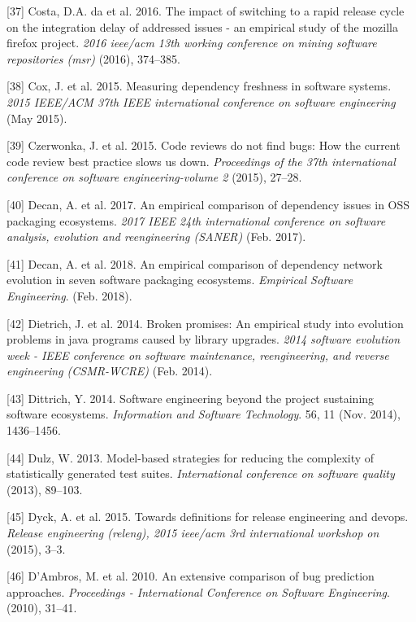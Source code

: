 \documentclass[]{book}
\begin{document}
\hypertarget{ref-da2016a}{}
{[}37{]} Costa, D.A. da et al. 2016. The impact of switching to a rapid
release cycle on the integration delay of addressed issues - an
empirical study of the mozilla firefox project. \emph{2016 ieee/acm 13th
working conference on mining software repositories (msr)} (2016),
374--385.

\hypertarget{ref-Cox2015}{}
{[}38{]} Cox, J. et al. 2015. Measuring dependency freshness in software
systems. \emph{2015 IEEE/ACM 37th IEEE international conference on
software engineering} (May 2015).

\hypertarget{ref-czerwonka2015code}{}
{[}39{]} Czerwonka, J. et al. 2015. Code reviews do not find bugs: How
the current code review best practice slows us down. \emph{Proceedings
of the 37th international conference on software engineering-volume 2}
(2015), 27--28.

\hypertarget{ref-Decan2017}{}
{[}40{]} Decan, A. et al. 2017. An empirical comparison of dependency
issues in OSS packaging ecosystems. \emph{2017 IEEE 24th international
conference on software analysis, evolution and reengineering (SANER)}
(Feb. 2017).

\hypertarget{ref-Decan2018}{}
{[}41{]} Decan, A. et al. 2018. An empirical comparison of dependency
network evolution in seven software packaging ecosystems.
\emph{Empirical Software Engineering}. (Feb. 2018).

\hypertarget{ref-Dietrich2014}{}
{[}42{]} Dietrich, J. et al. 2014. Broken promises: An empirical study
into evolution problems in java programs caused by library upgrades.
\emph{2014 software evolution week - IEEE conference on software
maintenance, reengineering, and reverse engineering (CSMR-WCRE)} (Feb.
2014).

\hypertarget{ref-Dittrich2014}{}
{[}43{]} Dittrich, Y. 2014. Software engineering beyond the project
sustaining software ecosystems. \emph{Information and Software
Technology}. 56, 11 (Nov. 2014), 1436--1456.

\hypertarget{ref-dulz2013model}{}
{[}44{]} Dulz, W. 2013. Model-based strategies for reducing the
complexity of statistically generated test suites. \emph{International
conference on software quality} (2013), 89--103.

\hypertarget{ref-dyck2015a}{}
{[}45{]} Dyck, A. et al. 2015. Towards definitions for release
engineering and devops. \emph{Release engineering (releng), 2015
ieee/acm 3rd international workshop on} (2015), 3--3.

\hypertarget{ref-DAmbros2010}{}
{[}46{]} D'Ambros, M. et al. 2010. An extensive comparison of bug
prediction approaches. \emph{Proceedings - International Conference on
Software Engineering}. (2010), 31--41.
\end{document}
